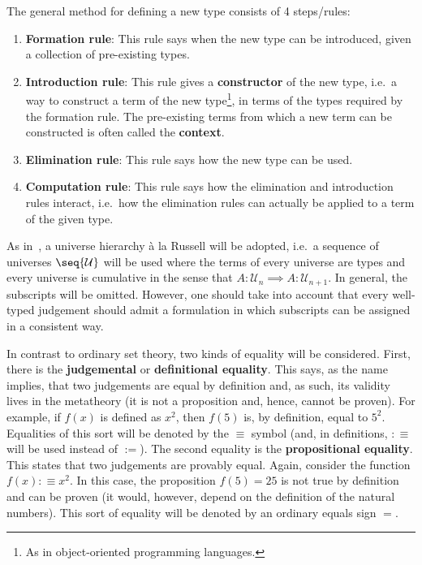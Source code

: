     \begin{method}
        The general method for defining a new type consists of 4 steps/rules:
        \begin{enumerate}
            \item \textbf{Formation rule}: This rule says when the new type can be introduced, given a collection of pre-existing types.
            \item \textbf{Introduction rule}: This rule gives a \textbf{constructor} of the new type, i.e.~a way to construct a term of the new type\footnote{As in object-oriented programming languages.}, in terms of the types required by the formation rule. The pre-existing terms from which a new term can be constructed is often called the \textbf{context}.
            \item \textbf{Elimination rule}: This rule says how the new type can be used.
            \item \textbf{Computation rule}: This rule says how the elimination and introduction rules interact, i.e.~how the elimination rules can actually be applied to a term of the given type.
        \end{enumerate}
    \end{method}

    As in~\citet{the_univalent_foundations_program_homotopy_2013}, a universe hierarchy \`a la Russell will be adopted, i.e.~a sequence of universes $\seq{\mathcal{U}}$ will be used where the terms of every universe are types and every universe is cumulative in the sense that $A:\mathcal{U}_n\implies A:\mathcal{U}_{n+1}$. In general, the subscripts will be omitted. However, one should take into account that every well-typed judgement should admit a formulation in which subscripts can be assigned in a consistent way.

    In contrast to ordinary set theory, two kinds of equality will be considered. First, there is the \textbf{judgemental} or \textbf{definitional equality}. This says, as the name implies, that two judgements are equal by definition and, as such, its validity lives in the metatheory (it is not a proposition and, hence, cannot be proven). For example, if $f(x)$ is defined as $x^2$, then $f(5)$ is, by definition, equal to $5^2$. Equalities of this sort will be denoted by the $\equiv$ symbol (and, in definitions, $:\equiv$ will be used instead of $:=$). The second equality is the \textbf{propositional equality}. This states that two judgements are provably equal. Again, consider the function $f(x):\equiv x^2$. In this case, the proposition $f(5)=25$ is not true by definition and can be proven (it would, however, depend on the definition of the natural numbers). This sort of equality will be denoted by an ordinary equals sign $=$.

